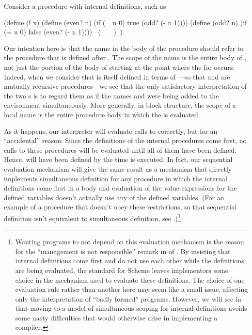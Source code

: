 Consider a procedure with internal definitions, such as

\begin{codeBlock}
(define (f x)
  (define (even? n) (if (= n 0) true  (odd?  (- n 1))))
  (define (odd? n)  (if (= n 0) false (even? (- n 1))))
  ~\(\langle \)~~~~\(\rangle \)~)
\end{codeBlock}

\noindent
Our intention here is that the name  in the body of the procedure
 should refer to the procedure  that is defined after
.  The scope of the name  is the entire body of
, not just the portion of the body of  starting at the point
where the  for  occurs.  Indeed, when we consider that
 is itself defined in terms of ---so that 
and  are mutually recursive procedures---we see that the only
satisfactory interpretation of the two s is to regard them as if
the names  and  were being added to the environment
simultaneously.  More generally, in block structure, the scope of a local name
is the entire procedure body in which the  is evaluated.

As it happens, our interpreter will evaluate calls to  correctly, but
for an ``accidental'' reason: Since the definitions of the internal procedures
come first, no calls to these procedures will be evaluated until all of them
have been defined.  Hence,   will have been defined by the time
 is executed.  In fact, our sequential evaluation mechanism will
give the same result as a mechanism that directly implements simultaneous
definition for any procedure in which the internal definitions come first in a
body and evaluation of the value expressions for the defined variables doesn't
actually use any of the defined variables.  (For an example of a procedure that
doesn't obey these restrictions, so that sequential definition isn't equivalent
to simultaneous definition, see .)\footnote{Wanting programs
to not depend on this evaluation mechanism is the reason for the ``management
is not responsible'' remark in  of .  By
insisting that internal definitions come first and do not use each other while
the definitions are being evaluated, the  standard for Scheme
leaves implementors some choice in the mechanism used to evaluate these
definitions.  The choice of one evaluation rule rather than another here may
seem like a small issue, affecting only the interpretation of ``badly formed''
programs.  However, we will see in  that moving to a model
of simultaneous scoping for internal definitions avoids some nasty difficulties
that would otherwise arise in implementing a compiler.}

